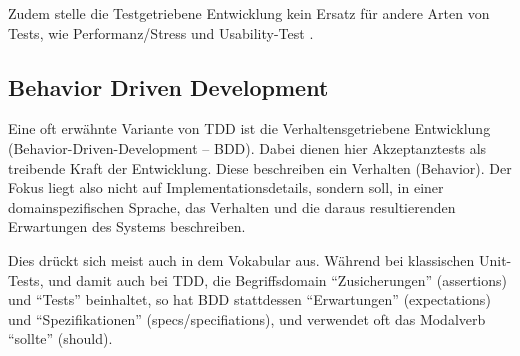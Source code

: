   Zudem stelle die Testgetriebene Entwicklung kein Ersatz für andere Arten von Tests, wie Performanz/Stress und Usability-Test \citep[S. 86]{beck_test_2002}.
  \subsection{Behavior Driven Development}
  
  Eine oft erwähnte Variante von TDD ist die Verhaltensgetriebene Entwicklung (Behavior-Driven-Development -- BDD). Dabei dienen hier Akzeptanztests als treibende Kraft der Entwicklung. Diese beschreiben ein Verhalten (Behavior). Der Fokus liegt also nicht auf Implementationsdetails, sondern soll, in einer domainspezifischen Sprache, das Verhalten und die daraus resultierenden Erwartungen des Systems beschreiben.
  
  Dies drückt sich meist auch in dem Vokabular aus. Während bei klassischen Unit-Tests, und damit auch bei TDD, die Begriffsdomain  "`Zusicherungen"' (assertions) und "`Tests"' beinhaltet, so hat BDD stattdessen "`Erwartungen"' (expectations) und "`Spezifikationen"' (specs/specifiations), und verwendet oft das Modalverb "`sollte"' (should).